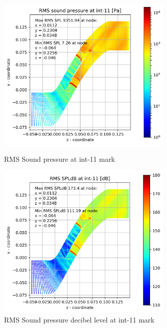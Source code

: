 \begin{figure}[ht]
  \centering
  \includegraphics[width=0.75\textwidth]{Figures/int-11-rms-spl.png}
  \caption{RMS Sound pressure at int-11 mark} \label{int-11-rms-spl}
  
  \vspace*{\floatsep}%

  \includegraphics[width=0.75\textwidth]{Figures/int-11-rms-spldb.png}
  \caption{RMS Sound pressure decibel level at int-11 mark} \label{int-11-rms-spldb}
\end{figure}
